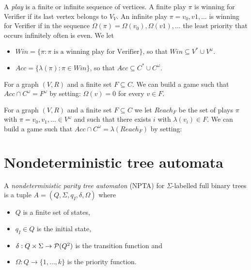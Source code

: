 \documentclass[runningheads,a4paper]{llncs}
\begin{document}
A \emph{play} is a finite or infinite sequence of vertices. A finite play $\pi$ is winning for Verifier if its last vertex  belongs to $V_V$. An infinite play $\pi = v_0, v1, \ldots$ is winning for Verifier if in the sequence $\Omega(\pi) = \Omega(v_0), \Omega(v1), \ldots$ the least priority that occurs infinitely often is even. We let 
\begin{itemize}
\item $Win = \{\pi : \pi \text{ is a winning play for Verifier} \}$, so that $Win \subseteq V^* \cup V^\omega$.
\item $Acc = \{\lambda(\pi) : \pi \in Win \}$, so that $Acc \subseteq C^* \cup C^\omega$.
\end{itemize}

\begin{example}
For a graph $(V, R)$ and a finite set $F \subseteq C$. We can build a game such that  $Acc \cap C^\omega = F^\omega$ by setting:
$\Omega(v) = 0$ for every $v \in F$.
\end{example}

\begin{example}
For a graph $(V, R)$ and a finite set $F \subseteq C$ we let $Reach_F$ be the set of plays $\pi$ with $\pi = v_0,v_1,\ldots \in V^\omega$ and such that there exists $i$ with $\lambda(v_i) \in F$. We can build a game such that  $Acc \cap C^\omega = \lambda(Reach_F)$ by setting:

\end{example}

\section{Nondeterministic tree automata}

\begin{definition}\label{def:NDPTA}
A \emph{nondeterministic parity tree automaton} (NPTA) for $\Sigma$-labelled full binary trees is a tuple $A = (Q, \Sigma, q_I, \delta, \Omega)$ where 
\begin{itemize}
\item $Q$ is a finite set of states,
\item $q_I \in Q$ is the initial state, 
\item $\delta: Q \times \Sigma \to \mathcal{P}(Q^2)$ is the transition function and 
\item $\Omega: Q \to \{1,\ldots, k\}$ is the priority function.
\end{itemize}
\end{definition}
\end{document}
